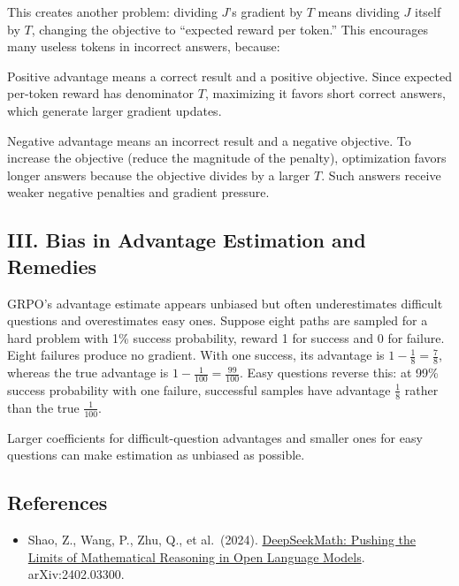 This creates another problem: dividing \(J\)'s gradient by \(T\) means dividing \(J\) itself by \(T\), changing the objective to ``expected reward per token.'' This encourages many useless tokens in incorrect answers, because:

Positive advantage means a correct result and a positive objective. Since expected per-token reward has denominator \(T\), maximizing it favors short correct answers, which generate larger gradient updates.

Negative advantage means an incorrect result and a negative objective. To increase the objective (reduce the magnitude of the penalty), optimization favors longer answers because the objective divides by a larger \(T\). Such answers receive weaker negative penalties and gradient pressure.

\hypertarget{iii.-bias-in-advantage-estimation-and-remedies}{%
\subsection{III. Bias in Advantage Estimation and Remedies}\label{iii.-bias-in-advantage-estimation-and-remedies}}

GRPO's advantage estimate appears unbiased but often underestimates difficult questions and overestimates easy ones. Suppose eight paths are sampled for a hard problem with 1\% success probability, reward 1 for success and 0 for failure. Eight failures produce no gradient. With one success, its advantage is \(1-\frac{1}{8}=\frac{7}{8}\), whereas the true advantage is \(1-\frac{1}{100}=\frac{99}{100}\). Easy questions reverse this: at 99\% success probability with one failure, successful samples have advantage \(\frac{1}{8}\) rather than the true \(\frac{1}{100}\).

Larger coefficients for difficult-question advantages and smaller ones for easy questions can make estimation as unbiased as possible.

\FloatBarrier
{}
\hypertarget{references-85}{%
\subsection{References}\label{references-85}}

\vspace{0.25em}
\begin{itemize}
\tightlist
\item
  Shao, Z., Wang, P., Zhu, Q., et al.~(2024). \href{https://arxiv.org/abs/2402.03300}{DeepSeekMath: Pushing the Limits of Mathematical Reasoning in Open Language Models}. arXiv:2402.03300.
\end{itemize}

\clearpage
